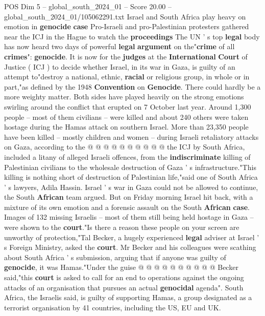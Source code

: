 \begin{textsample}{POS Dim 5 – global\_south\_2024\_01 – Score 20.00 – global\_south\_2024\_01/105062291.txt}  \label{ex:f5_pos_019}
Israel and South Africa play heavy on emotion in \textbf{genocide} \textbf{case} Pro-Israeli and pro-Palestinian protesters gathered near the ICJ in the Hague to watch the \textbf{proceedings} The UN ' s top \textbf{legal} body has now heard two days of powerful \textbf{legal} \textbf{argument} on the"\textbf{crime} of all \textbf{crimes}": \textbf{genocide}.
It is now for the \textbf{judges} at the \textbf{International} \textbf{Court} of Justice ( ICJ ) to decide whether Israel, in its war in Gaza, is guilty of an attempt to"destroy a national, ethnic, \textbf{racial} or religious group, in whole or in part,"as defined by the 1948 \textbf{Convention} on \textbf{Genocide}.
There could hardly be a more weighty matter.
Both sides have played heavily on the strong emotions swirling around the conflict that erupted on 7 October last year.
Around 1,300 people -- most of them civilians -- were killed and about 240 others were taken hostage during the Hamas attack on southern Israel.
More than 23,350 people have been killed -- mostly children and women -- during Israeli retaliatory attacks on Gaza, according to the @ @ @ @ @ @ @ @ @ @ the ICJ by South Africa, included a litany of alleged Israeli offences, from the \textbf{indiscriminate} killing of Palestinian civilians to the wholesale destruction of Gaza ' s infrastructure."This killing is nothing short of destruction of Palestinian life,"said one of South Africa ' s lawyers, Adila Hassin.
Israel ' s war in Gaza could not be allowed to continue, the South \textbf{African} team argued.
But on Friday morning Israel hit back, with a mixture of its own emotion and a forensic assault on the South \textbf{African} \textbf{case}.
Images of 132 missing Israelis -- most of them still being held hostage in Gaza -- were shown to the \textbf{court}."Is there a reason these people on your screen are unworthy of protection,"Tal Becker, a hugely experienced \textbf{legal} adviser at Israel ' s Foreign Ministry, asked the \textbf{court}.
Mr Becker and his colleagues were scathing about South Africa ' s submission, arguing that if anyone was guilty of \textbf{genocide}, it was Hamas."Under the guise @ @ @ @ @ @ @ @ @ @ Becker said,"this \textbf{court} is asked to call for an end to operations against the ongoing attacks of an organisation that pursues an actual \textbf{genocidal} agenda".
South Africa, the Israelis said, is guilty of supporting Hamas, a group designated as a terrorist organisation by 41 countries, including the US, EU and UK.

\end{textsample}
